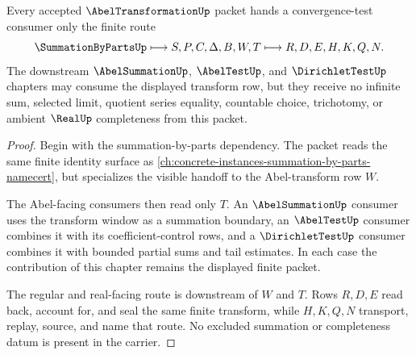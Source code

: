 \begin{theorem}
\label{thm:abel-transformation-summation-handoff}
Every accepted $\AbelTransformationUp$ packet hands a convergence-test consumer only the finite route
$$
\SummationByPartsUp \longmapsto S,P,C,\Delta,B,W,T \longmapsto R,D,E,H,K,Q,N .
$$
The downstream $\AbelSummationUp$, $\AbelTestUp$, and $\DirichletTestUp$ chapters may consume the displayed transform row, but they receive no infinite sum, selected limit, quotient series equality, countable choice, trichotomy, or ambient $\RealUp$ completeness from this packet.
\end{theorem}
\begin{proof}
Begin with the summation-by-parts dependency. The packet reads the same finite identity surface as \autoref{ch:concrete-instances-summation-by-parts-namecert}, but specializes the visible handoff to the Abel-transform row $W$.

The Abel-facing consumers then read only $T$. An $\AbelSummationUp$ consumer uses the transform window as a summation boundary, an $\AbelTestUp$ consumer combines it with its coefficient-control rows, and a $\DirichletTestUp$ consumer combines it with bounded partial sums and tail estimates. In each case the contribution of this chapter remains the displayed finite packet.

The regular and real-facing route is downstream of $W$ and $T$. Rows $R,D,E$ read back, account for, and seal the same finite transform, while $H,K,Q,N$ transport, replay, source, and name that route. No excluded summation or completeness datum is present in the carrier.
\end{proof}



